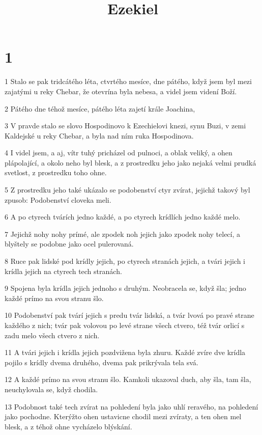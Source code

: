 

\title{Ezekiel}

\chapter{1}

\par 1 Stalo se pak tridcátého léta, ctvrtého mesíce, dne pátého, když jsem byl mezi zajatými u reky Chebar, že otevrína byla nebesa, a videl jsem videní Boží.
\par 2 Pátého dne téhož mesíce, pátého léta zajetí krále Joachina,
\par 3 V pravde stalo se slovo Hospodinovo k Ezechielovi knezi, synu Buzi, v zemi Kaldejské u reky Chebar, a byla nad ním ruka Hospodinova.
\par 4 I videl jsem, a aj, vítr tuhý pricházel od pulnoci, a oblak veliký, a ohen plápolající, a okolo neho byl blesk, a z prostredku jeho jako nejaká velmi prudká svetlost, z prostredku toho ohne.
\par 5 Z prostredku jeho také ukázalo se podobenství ctyr zvírat, jejichž takový byl zpusob: Podobenství cloveka meli.
\par 6 A po ctyrech tvárích jedno každé, a po ctyrech krídlích jedno každé melo.
\par 7 Jejichž nohy nohy prímé, ale zpodek noh jejich jako zpodek nohy telecí, a blyštely se podobne jako ocel pulerovaná.
\par 8 Ruce pak lidské pod krídly jejich, po ctyrech stranách jejich, a tvári jejich i krídla jejich na ctyrech tech stranách.
\par 9 Spojena byla krídla jejich jednoho s druhým. Neobracela se, když šla; jedno každé prímo na svou stranu šlo.
\par 10 Podobenství pak tvárí jejich s predu tvár lidská, a tvár lvová po pravé strane každého z nich; tvár pak volovou po levé strane všech ctvero, též tvár orlicí s zadu melo všech ctvero z nich.
\par 11 A tvári jejich i krídla jejich pozdvižena byla zhuru. Každé zvíre dve krídla pojilo s krídly dvema druhého, dvema pak prikrývala tela svá.
\par 12 A každé prímo na svou stranu šlo. Kamkoli ukazoval duch, aby šla, tam šla, neuchylovala se, když chodila.
\par 13 Podobnost také tech zvírat na pohledení byla jako uhlí reravého, na pohledení jako pochodne. Kterýžto ohen ustavicne chodil mezi zvíraty, a ten ohen mel blesk, a z téhož ohne vycházelo blýskání.
